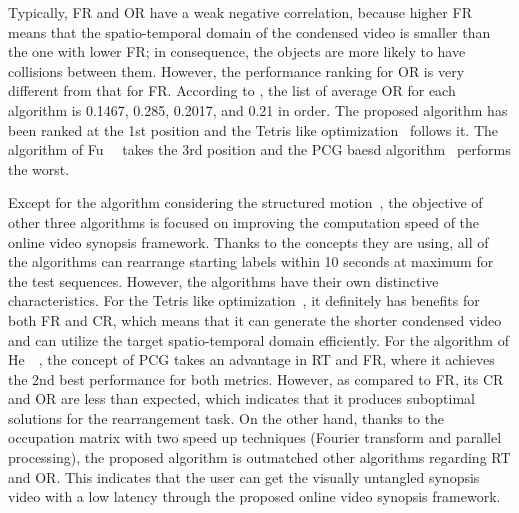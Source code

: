 \documentclass[11pt]{hyu_thesis}
\begin{document}
Typically, FR and OR have a weak negative correlation, because higher FR means that the spatio-temporal domain of the condensed video is smaller than the one with lower FR; in consequence, the objects are more likely to have collisions between them. However, the performance ranking for OR is very different from that for FR. According to , the list of average OR for each algorithm is 0.1467, 0.285, 0.2017, and 0.21 in order. The proposed algorithm has been ranked at the 1st position and the Tetris like optimization~\cite{JianqingZhu2015} follows it. The algorithm of Fu~\etal~\cite{Fu2014} takes the 3rd position and the PCG baesd algorithm~\cite{He2017} performs the worst.

Except for the algorithm considering the structured motion~\cite{Fu2014}, the objective of other three algorithms is focused on improving the computation speed of the online video synopsis framework. Thanks to the concepts they are using, all of the algorithms can rearrange starting labels within 10 seconds at maximum for the test sequences. However, the algorithms have their own distinctive characteristics. For the Tetris like optimization~\cite{JianqingZhu2015}, it definitely has benefits for both FR and CR, which means that it can generate the shorter condensed video and can utilize the target spatio-temporal domain efficiently. For the algorithm of He~\etal~\cite{He2017}, the concept of PCG takes an advantage in RT and FR, where it achieves the 2nd best performance for both metrics. However, as compared to FR, its CR and OR are less than expected, which indicates that it produces suboptimal solutions for the rearrangement task. On the other hand, thanks to the occupation matrix with two speed up techniques (Fourier transform and parallel processing), the proposed algorithm is outmatched other algorithms regarding RT and OR. This indicates that the user can get the visually untangled synopsis video with a low latency through the proposed online video synopsis framework.

\tableVCOne
{}\tableVCTwo
{}\tableVCThree
{}\tableVCFour
{}\tableVCFive
{}\tableVCSix
\end{document}
